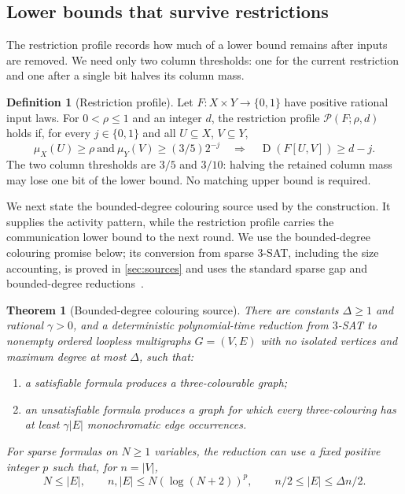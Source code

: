 \documentclass[11pt]{article} \usepackage[utf8]{inputenc}
\theoremstyle{plain} \newtheorem{theorem}{Theorem}[section]
\theoremstyle{definition} \newaliascnt{definition}{theorem}
\newtheorem{definition}[definition]{Definition} \aliascntresetthe{definition}
\newcommand{\D}{\operatorname{D}}
\newcommand{\RP}[3]{\mathcal{P}(#1;#2,#3)}
\begin{document}
\subsection{Lower bounds that survive restrictions}

The restriction profile records how much of a lower bound remains after
inputs are removed. We need only two column thresholds: one for the
current restriction and one after a single bit halves its column mass.

\begin{definition}[Restriction profile]
\label{def:profile}
Let \(F:X\times Y\to\{0,1\}\) have positive rational input laws. For
\(0<\rho\le1\) and an integer \(d\), the restriction profile \(\RP{F}{\rho}{d}\)
holds if, for every \(j\in\{0,1\}\) and all \(U\subseteq X\), \(V\subseteq
Y\),
\[
\mu_X(U)\ge\rho\ \text{and}\ \mu_Y(V)\ge(3/5)2^{-j} \quad\Longrightarrow\quad
\D(F[U,V])\ge d-j.
\]
The two column thresholds are $3/5$ and $3/10$: halving the retained column
mass may lose one bit of the lower bound. No matching upper bound is required.
\end{definition}

We next state the bounded-degree colouring source used by the construction. It
supplies the activity pattern, while the restriction profile carries the
communication lower bound to the next round. We use the bounded-degree colouring
promise below; its conversion from sparse \(3\)-SAT, including the size
accounting, is proved in \cref{sec:sources} and uses the standard sparse gap and
bounded-degree reductions~\cite{dinur2007pcp,bogdanov2002lower}.

\begin{theorem}[Bounded-degree colouring source]
\label{src:gap-colouring}
There are constants \(\Delta\ge1\) and rational \(\gamma>0\), and a
deterministic polynomial-time reduction from \(3\)-SAT to nonempty ordered
loopless multigraphs \(G=(V,E)\) with no isolated vertices and maximum degree at
most \(\Delta\), such that:
\begin{enumerate}
\item a satisfiable formula produces a three-colourable graph;
\item an unsatisfiable formula produces a graph for which every three-colouring has at least \(\gamma|E|\) monochromatic edge occurrences.
\end{enumerate}
For sparse formulas on \(N\ge1\) variables, the reduction can use a fixed
positive integer \(p\) such that, for \(n=|V|\),
\[
N\le |E|,\qquad n,|E|\le N(\log(N+2))^p,\qquad n/2\le |E|\le\Delta n/2.
\]
\end{theorem}
\end{document}
